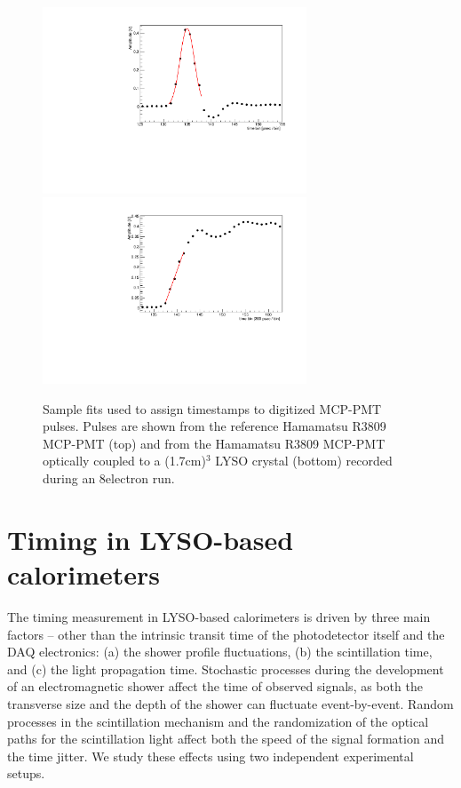 \begin{figure}[h] \centering
\includegraphics[width=0.7\textwidth]{figs/timing/Reference_Pulse_GausFit_057_ev322.pdf} 
\includegraphics[width=0.7\textwidth]{figs/timing/LYSOCube_Pulse_RisingEdgeFit_057_ev313.pdf} 
\caption{ Sample fits used to assign timestamps to digitized MCP-PMT pulses. 
Pulses are shown from the reference Hamamatsu R3809 MCP-PMT (top) and from the Hamamatsu R3809 MCP-PMT
optically coupled to a (1.7\unit{cm})$^{3}$  LYSO crystal (bottom)
recorded during an 8\GeV electron run.}
\label{fig:PulseFits}
\end{figure}


\section{Timing in LYSO-based calorimeters}
The timing measurement in 
LYSO-based calorimeters is driven by three main factors  -- other  than the intrinsic transit 
time of the photodetector itself and the DAQ electronics: (a) the shower profile fluctuations,  
(b) the scintillation time, and (c) the light propagation time. Stochastic processes during the
development of an electromagnetic shower affect the time of observed signals, as
both the transverse size and the depth of the shower can fluctuate event-by-event. 
Random processes in the scintillation mechanism and the randomization of
the optical paths for the scintillation light affect both the speed of the
signal formation and the time jitter. We study these effects using two
independent experimental setups. 

